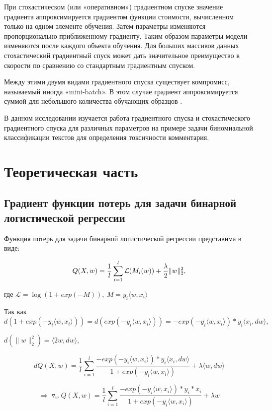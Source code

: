 \documentclass{article}
\begin{document}
При стохастическом (или «оперативном») градиентном спуске значение градиента аппроксимируется градиентом функции стоимости, вычисленном только на одном элементе обучения. Затем параметры изменяются пропорционально приближенному градиенту. Таким образом параметры модели изменяются после каждого объекта обучения. Для больших массивов данных стохастический градиентный спуск может дать значительное преимущество в скорости по сравнению со стандартным градиентным спуском.

Между этими двумя видами градиентного спуска существует компромисс, называемый иногда «mini-batch». В этом случае градиент аппроксимируется суммой для небольшого количества обучающих образцов \cite{ss0}.

В данном исследовании изучается работа градиентного спуска и стохастического градиентного спуска для различных параметров на примере задачи биномиальной классификации текстов для определения токсичности комментария.

\section{Теоретическая часть}
\subsection{Градиент функции потерь для задачи бинарной логистической регрессии}

Функция потерь для задачи бинарной логистической регрессии представима в виде:

$$Q(X, w) = \frac{1}{l}\sum_{i=1}^l\mathcal{L}(M_i(w))+\frac{\lambda}{2}\|\\w\|_2^2,$$

где $\mathcal{L} = \log{(1+exp(-M))},\: M = y_i\langle w, x_i\rangle$


Так как $d(1 + exp(-y_i\langle w, x_i\rangle)) = d(exp(-y_i\langle w, x_i\rangle)) = - exp(-y_i\langle w, x_i\rangle) * y_i\langle x_i, dw\rangle,$


$d(\|w\|_2^2) = \langle 2w, dw\rangle,$


$$dQ(X, w) = \frac{1}{l}\sum_{i=1}^l\frac{ - exp(-y_i\langle w, x_i\rangle) * y_i\langle x_i, dw\rangle}{1 + exp(-y_i\langle w, x_i\rangle)}  + \lambda \langle w, dw\rangle $$

$$\Rightarrow \triangledown_w Q(X, w) = \frac{1}{l}\sum_{i=1}^l\frac{ - exp(-y_i\langle w, x_i\rangle) * y_i * x_i}{1 + exp(-y_i\langle w, x_i\rangle)}  + \lambda w $$
\end{document}
